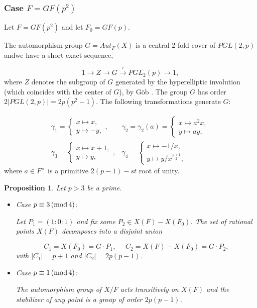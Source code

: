 \documentclass[12pt]{article}
\newtheorem{proposition}[theorem]{Proposition}
\numberwithin{equation}{section}
\begin{document}
\subsubsection{Case $F=GF(p^2)$}
\label{sec:gfp2}

Let $F=GF(p^2)$ and let $F_0=GF(p)$.

The automorphism group $G=Aut_F(X)$ is
a central 2-fold cover of $PGL(2,p)$ andwe have a short exact sequence,

\begin{equation}
\label{eqn:**}
1\rightarrow Z \rightarrow G
\stackrel{\tau}{\rightarrow} PGL_2(p)\rightarrow 1,
\end{equation}
where $Z$ denotes the subgroup of $G$ generated by the hyperelliptic
involution (which coincides with the center of $G$), 
by G\"ob \cite{G}.
The group $G$ has order $2|PGL(2,p)|=2p(p^2-1)$.
The following transformations generate $G$:

\[
\begin{array}{cc}
\gamma_1=
\left\{
\begin{array}{c}
x\longmapsto x,\\
y\longmapsto -y,
\end{array}
\right. ,
&
\gamma_2=\gamma_2(a)=
\left\{
\begin{array}{c}
x\longmapsto a^2x,\\
y\longmapsto ay,
\end{array}
\right.\\
\gamma_3=
\left\{
\begin{array}{c}
x\longmapsto x+1,\\
y\longmapsto y,
\end{array}
\right. ,
&
\gamma_4=
\left\{
\begin{array}{c}
x\longmapsto -1/x,\\
y\longmapsto y/x^{\frac{p+1}{2}},
\end{array}
\right. 
\end{array}
\]
where $a\in F^\times$ is a primitive $2(p-1)-st$ root
of unity.


\begin{proposition}
\label{prop:orbits} 
Let $p>3$ be a prime.
\begin{itemize}
\item[(a)] Case $p\equiv 3\, ({\rm mod}\, 4)$:

Let $P_1=(1:0:1)$ and fix some $P_2\in X(F)-X(F_0)$.
The set of rational points $X(F)$ decomposes into
a disjoint union

\[
C_1=X(F_0)=G\cdot P_1,\ \ \ \ \ \ 
C_2=X(F)-X(F_0)=G\cdot P_2,
\]
with $|C_1|=p+1$ and $|C_2|=2p(p-1)$.

\item[(b)] Case $p\equiv 1\, ({\rm mod}\, 4)$:

The automorphism group of $X/F$ acts transitively
on $X(F)$ and the stabilizer of any point is
a group of order $2p(p-1)$.

\end{itemize}
\end{proposition}
\end{document}
